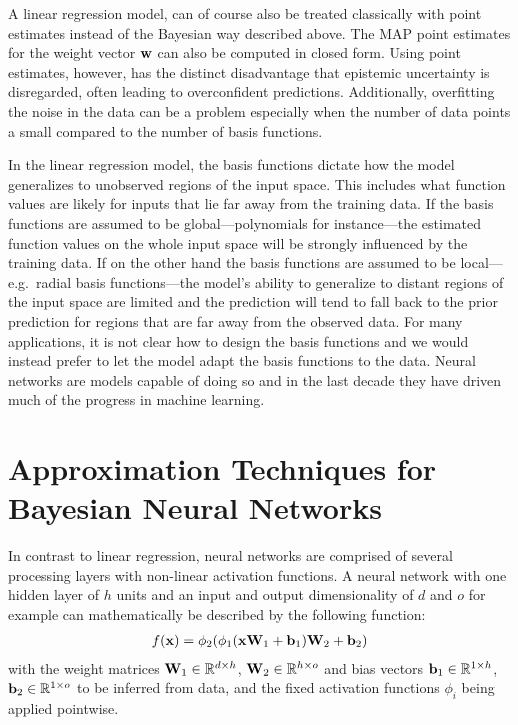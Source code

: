 \documentclass[../thesis.tex]{subfiles}
\begin{document}
A linear regression model, can of course also be treated classically with point estimates instead of the Bayesian way described above. The MAP point estimates for the weight vector $\boldsymbol{\mathbf{w}}$ can also be computed in closed form. Using point estimates, however, has the distinct disadvantage that epistemic uncertainty is disregarded, often leading to overconfident predictions. Additionally, overfitting the noise in the data can be a problem especially when the number of data points a small compared to the number of basis functions.

In the linear regression model, the basis functions dictate how the model generalizes to unobserved regions of the input space. This includes what function values are likely for inputs that lie far away from the training data. If the basis functions are assumed to be global---polynomials for instance---the estimated function values on the whole input space will be strongly influenced by the training data. If on the other hand the basis functions are assumed to be local---e.g.\ radial basis functions---the model's ability to generalize to distant regions of the input space are limited and the prediction will tend to fall back to the prior prediction for regions that are far away from the observed data. For many applications, it is not clear how to design the basis functions and we would instead prefer to let the model adapt the basis functions to the data. Neural networks are models capable of doing so and in the last decade they have driven much of the progress in machine learning.


\section{Approximation Techniques for Bayesian Neural Networks}
In contrast to linear regression, neural networks are comprised of several processing layers with non-linear activation functions. A neural network with one hidden layer of $h$ units and an input and output dimensionality of $d$ and $o$ for example can mathematically be described by the following function:
\begin{equation}
    \begin{split}
        f(\boldsymbol{\mathbf{x}}) = \phi_2(\phi_1(\boldsymbol{\mathbf{x}} \boldsymbol{\mathbf{W}}_1 + \boldsymbol{\mathbf{b}}_1) \boldsymbol{\mathbf{W}}_2 + \boldsymbol{\mathbf{b}}_2)
    \end{split}
\end{equation}
with the weight matrices $\boldsymbol{\mathbf{W}}_1 \in \mathbb{R}^{d \times h}$, $\boldsymbol{\mathbf{W}}_2 \in \mathbb{R}^{h \times o}$ and bias vectors $\boldsymbol{\mathbf{b}}_1 \in \mathbb{R}^{1 \times h}$, $\boldsymbol{\mathbf{b}}_2 \in \mathbb{R}^{1 \times o}$ to be inferred from data, and the fixed activation functions $\phi_i$ being applied pointwise.
\end{document}
